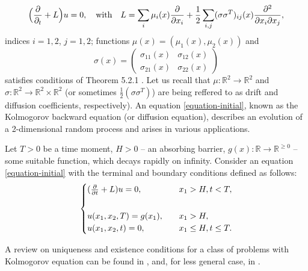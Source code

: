 \documentclass[a4paper]{jpconf}
\newcommand{\R}{{\mathbb R}}
\begin{document}
{\begin{equation}\label{equation-initial}
\Bigl(\frac{\partial}{\partial_t} + L\Bigr) u = 0, \quad \textrm{with} \quad L = \sum_{i} \mu_i(x) \frac{\partial}{\partial x_i} + \frac{1}{2} \sum_{i,j} (\sigma \sigma^T)_{ij}(x) \frac{\partial^2}{\partial x_i \partial x_j},
\end{equation}
indices $i = 1,2$, $j=1,2$; functions $\mu(x) = (\mu_1(x),\mu_2(x))$ and
$$\sigma(x) =
\begin{pmatrix}
\sigma_{11}(x) & \sigma_{12}(x) \\
\sigma_{21}(x) & \sigma_{22}(x)
\end{pmatrix}$$
satisfies conditions of Theorem 5.2.1 \cite{oksendal}.
Let us recall that $\mu:\R^2\to\R^2$ and $\sigma:\R^2\to\R^2\times\R^2$ (or sometimes $\frac{1}{2}(\sigma \sigma^T)$) are being reffered to as drift and diffusion coefficients, respectively). An equation \eqref{equation-initial}, known as the Kolmogorov backward equation (or diffusion equation), describes an evolution of a 2-dimensional random process and arises in various applications.

Let $T>0$ be a time moment, $H>0$ -- an absorbing barrier, $g(x): \R \rightarrow \R^{\ge 0}$ -- some suitable function, which decays rapidly on infinity. Consider an equation \eqref{equation-initial} with the terminal and boundary conditions defined as follows:
\begin{equation}\label{problem-initial}
\begin{array}{l}
\begin{cases}
(\frac{\partial}{\partial t} + L) u = 0, \quad &x_1 > H,  t < T, \\
\smallskip \\
u(x_1,x_2,T) = g(x_1), \quad &x_1 > H, \\
u(x_1,x_2,t) = 0, \quad &x_1 \le H, t \le T.\\
\end{cases}
\end{array}
\end{equation}

A review on uniqueness and existence conditions for a class of problems with Kolmogorov equation can be found in \cite{estrom, oksendal}, and, for less general case, in \cite{chiarella, heston_optandbubbles}.

}
\end{document}
